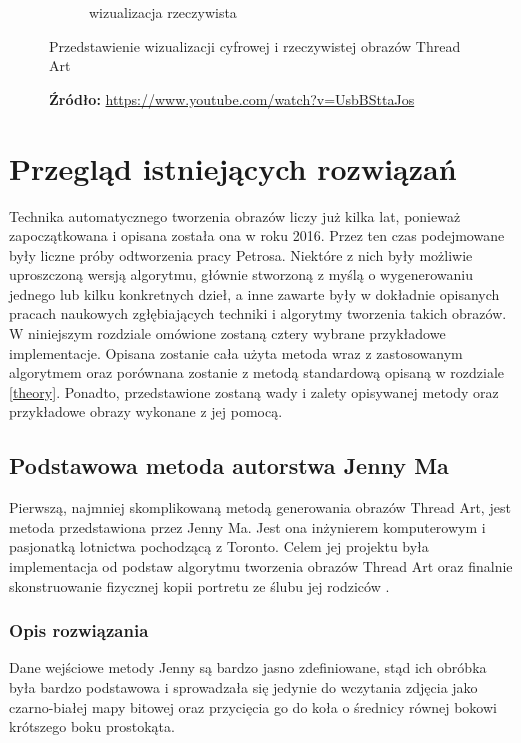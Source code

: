 \documentclass[a4paper, 12pt, polish, twoside]{extreport}
\begin{document}
\begin{figure}[H]
\begin{subfigure}{0.49\textwidth}
            \caption{wizualizacja rzeczywista}
            \label{theory-technics-vis-comp-b}
        \end{subfigure}
        \caption{Przedstawienie wizualizacji cyfrowej i rzeczywistej obrazów Thread Art}
        \caption*{\footnotesize{\textbf{Źródło:}
        \url{https://www.youtube.com/watch?v=UsbBSttaJos}}}
        \label{theory-technics-vis-comp}
        \end{figure}
            
\chapter{Przegląd istniejących rozwiązań} \label{others}
Technika automatycznego tworzenia obrazów liczy już kilka lat, ponieważ zapoczątkowana i opisana została ona w roku 2016. Przez ten czas podejmowane były liczne próby odtworzenia pracy Petrosa. Niektóre z nich były możliwie uproszczoną wersją algorytmu, głównie stworzoną z myślą o wygenerowaniu jednego lub kilku konkretnych dzieł, a inne zawarte były w dokładnie opisanych pracach naukowych zgłębiających techniki i algorytmy tworzenia takich obrazów. W niniejszym rozdziale omówione zostaną cztery wybrane przykładowe implementacje. Opisana zostanie cała użyta metoda wraz z zastosowanym algorytmem oraz porównana zostanie z metodą standardową opisaną w rozdziale \ref{theory}. Ponadto, przedstawione zostaną wady i zalety opisywanej metody oraz przykładowe obrazy wykonane z jej pomocą.
    \section{Podstawowa metoda autorstwa Jenny Ma} \label{others-jenny}
    Pierwszą, najmniej skomplikowaną metodą generowania obrazów Thread Art, jest metoda przedstawiona przez Jenny Ma. Jest ona inżynierem komputerowym i pasjonatką lotnictwa pochodzącą z Toronto. Celem jej projektu była implementacja od podstaw algorytmu tworzenia obrazów Thread Art oraz finalnie skonstruowanie fizycznej kopii portretu ze ślubu jej rodziców \cite{jenny-youtube}.
        \subsection{Opis rozwiązania}
        Dane wejściowe metody Jenny są bardzo jasno zdefiniowane, stąd ich obróbka była bardzo podstawowa i sprowadzała się jedynie do wczytania zdjęcia jako czarno-białej mapy bitowej oraz przycięcia go do koła o średnicy równej bokowi krótszego boku prostokąta. 
        
\end{document}
